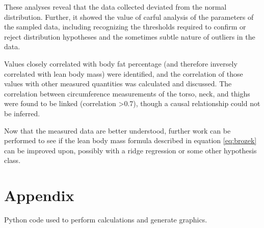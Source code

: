 \documentclass{IEEEtran}
\begin{document}
These analyses reveal that the data collected deviated from the normal distribution. Further, it showed the value of carful analysis of the parameters of the sampled data, including recognizing the thresholds required to confirm or reject distribution hypotheses and the sometimes subtle nature of outliers in the data.

Values closely correlated with body fat percentage (and therefore inversely correlated with lean body mass) were identified, and the correlation of those values with other measured quantities was calculated and discussed. The correlation between circumference measurements of the torso, neck, and thighs were found to be linked (correlation \textgreater\num{0.7}), though a causal relationship could not be inferred. 

Now that the measured data are better understood, further work can be performed to see if the lean body mass formula described in equation \ref{eq:brozek} can be improved upon, possibly with a ridge regression or some other hypothesis class.

\printbibliography

\onecolumn
\section{Appendix}
Python code used to perform calculations and generate graphics.
\lstset{frame=single}

\end{document}
